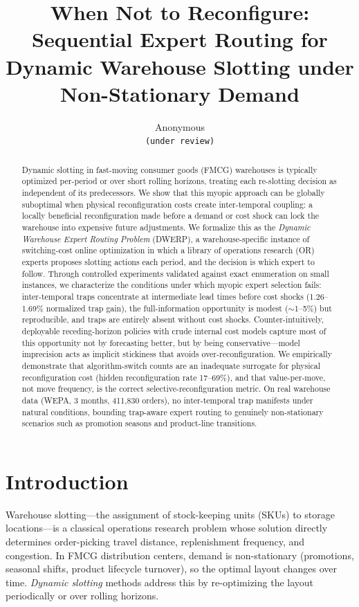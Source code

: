 \documentclass[11pt,a4paper]{article}
\title{When Not to Reconfigure: Sequential Expert Routing for\\
Dynamic Warehouse Slotting under Non-Stationary Demand}
\author{%
  Anonymous\\
  \texttt{(under review)}
}
\date{}
\begin{document}
\maketitle

\begin{abstract}
Dynamic slotting in fast-moving consumer goods (FMCG) warehouses is
typically optimized per-period or over short rolling horizons, treating
each re-slotting decision as independent of its predecessors. We show that
this myopic approach can be globally suboptimal when physical
reconfiguration costs create inter-temporal coupling: a locally beneficial
reconfiguration made before a demand or cost shock can lock the warehouse
into expensive future adjustments. We formalize this as the
\emph{Dynamic Warehouse Expert Routing Problem} (DWERP), a
warehouse-specific instance of switching-cost online optimization in which
a library of operations research (OR) experts proposes slotting actions
each period, and the decision is which expert to follow. Through
controlled experiments validated against exact enumeration on small
instances, we characterize the conditions under which myopic expert
selection fails: inter-temporal traps concentrate at intermediate lead
times before cost shocks (1.26--1.69\% normalized trap gain), the
full-information opportunity is modest ($\sim$1--5\%) but reproducible, and
traps are entirely absent without cost shocks. Counter-intuitively,
deployable receding-horizon policies with crude internal cost models
capture most of this opportunity not by forecasting better, but by being
conservative---model imprecision acts as implicit stickiness that avoids
over-reconfiguration. We empirically demonstrate that algorithm-switch
counts are an inadequate surrogate for physical reconfiguration cost
(hidden reconfiguration rate 17--69\%), and that value-per-move, not move
frequency, is the correct selective-reconfiguration metric. On real
warehouse data (WEPA, 3 months, 411{,}830 orders), no inter-temporal trap
manifests under natural conditions, bounding trap-aware expert routing to
genuinely non-stationary scenarios such as promotion seasons and
product-line transitions.
\end{abstract}

\section{Introduction}\label{sec:intro}

Warehouse slotting---the assignment of stock-keeping units (SKUs) to
storage locations---is a classical operations research problem whose
solution directly determines order-picking travel distance, replenishment
frequency, and congestion. In FMCG distribution centers, demand is
non-stationary (promotions, seasonal shifts, product lifecycle turnover),
so the optimal layout changes over time. \emph{Dynamic slotting} methods
address this by re-optimizing the layout periodically or over rolling
horizons.
\end{document}
